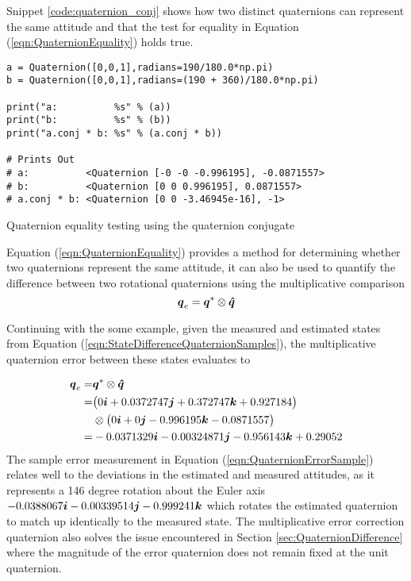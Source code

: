 Snippet \ref{code:quaternion_conj} shows how two distinct quaternions can represent the same attitude and that the test for equality in Equation (\ref{eqn:QuaternionEquality}) holds true.

\begin{listing}
\begin{singlespace}
  \begin{verbatim}
a = Quaternion([0,0,1],radians=190/180.0*np.pi)
b = Quaternion([0,0,1],radians=(190 + 360)/180.0*np.pi)

print("a:          %s" % (a))
print("b:          %s" % (b))
print("a.conj * b: %s" % (a.conj * b))

# Prints Out
# a:          <Quaternion [-0 -0 -0.996195], -0.0871557>
# b:          <Quaternion [0 0 0.996195], 0.0871557>
# a.conj * b: <Quaternion [0 0 -3.46945e-16], -1>
  \end{verbatim}
\caption{Quaternion equality testing using the quaternion conjugate}
\label{code:quaternion_conj}
\nocite{minted}
\end{singlespace}
\end{listing}

Equation (\ref{eqn:QuaternionEquality}) provides a method for determining whether two quaternions represent the same attitude, it can also be used to quantify the difference between two rotational quaternions using the multiplicative comparison
\begin{equation}
  \boldsymbol{q}_e = \boldsymbol{q}^* \otimes \boldsymbol{\hat{q}}
  \label{eqn:QuaternionError}
\end{equation}

Continuing with the some example, given the measured and estimated states from Equation (\ref{eqn:StateDifferenceQuaternionSamples}), the multiplicative quaternion error between these states evaluates to

\begin{equation}
  \begin{aligned}
    \boldsymbol{q}_e = & \boldsymbol{q}^* \otimes \boldsymbol{\hat{q}} \\
    = & \big( 0 \boldsymbol{i} +0.0372747 \boldsymbol{j} +0.372747 \boldsymbol{k} +0.927184 \big) \\
    & \otimes \big( 0 \boldsymbol{i} +0 \boldsymbol{j} -0.996195 \boldsymbol{k} -0.0871557 \big)\\
    = & -0.0371329 \boldsymbol{i} -0.00324871 \boldsymbol{j} -0.956143 \boldsymbol{k} +0.29052
  \end{aligned}
  \label{eqn:QuaternionErrorSample}
\end{equation}
The sample error measurement in Equation (\ref{eqn:QuaternionErrorSample}) relates well to the deviations in the estimated and measured attitudes, as it represents a 146 degree rotation about the Euler axis $-0.0388067 \boldsymbol{i} -0.00339514 \boldsymbol{j} -0.999241\boldsymbol{k}$ which rotates the estimated quaternion to match up identically to the measured state.  The multiplicative error correction quaternion also solves the issue encountered in Section \ref{sec:QuaternionDifference} where the magnitude of the error quaternion does not remain fixed at the unit quaternion.

